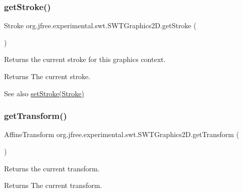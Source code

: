 \subsubsection{\texorpdfstring{get\+Stroke()}{getStroke()}}
{\footnotesize\ttfamily Stroke org.\+jfree.\+experimental.\+swt.\+S\+W\+T\+Graphics2\+D.\+get\+Stroke (\begin{DoxyParamCaption}{ }\end{DoxyParamCaption})}

Returns the current stroke for this graphics context.

\begin{DoxyReturn}{Returns}
The current stroke.
\end{DoxyReturn}
\begin{DoxySeeAlso}{See also}
\mbox{\hyperlink{classorg_1_1jfree_1_1experimental_1_1swt_1_1_s_w_t_graphics2_d_a90d9530e375f481dca4ea8a0b75372ca}{set\+Stroke(\+Stroke)}} 
\end{DoxySeeAlso}
\mbox{\label{classorg_1_1jfree_1_1experimental_1_1swt_1_1_s_w_t_graphics2_d_a894ffd588ccacb2e0f62ca4c72b4ad66}} 
\subsubsection{\texorpdfstring{get\+Transform()}{getTransform()}}
{\footnotesize\ttfamily Affine\+Transform org.\+jfree.\+experimental.\+swt.\+S\+W\+T\+Graphics2\+D.\+get\+Transform (\begin{DoxyParamCaption}{ }\end{DoxyParamCaption})}

Returns the current transform.

\begin{DoxyReturn}{Returns}
The current transform. 
\end{DoxyReturn}
\mbox{\label{classorg_1_1jfree_1_1experimental_1_1swt_1_1_s_w_t_graphics2_d_a368938000d74db081784e61a5895b1be}} 
